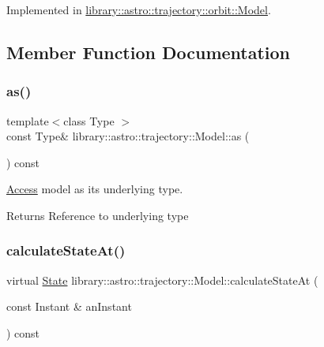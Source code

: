 Implemented in \hyperlink{classlibrary_1_1astro_1_1trajectory_1_1orbit_1_1_model_a1d580725a826a6d16d2c3d4cf2022a50}{library\+::astro\+::trajectory\+::orbit\+::\+Model}.



\subsection{Member Function Documentation}
\mbox{\label{classlibrary_1_1astro_1_1trajectory_1_1_model_a6f03598834d74ef1e03ce3469e892e6c}} 
\subsubsection{\texorpdfstring{as()}{as()}}
{\footnotesize\ttfamily template$<$class Type $>$ \\
const Type\& library\+::astro\+::trajectory\+::\+Model\+::as (\begin{DoxyParamCaption}{ }\end{DoxyParamCaption}) const\hspace{0.3cm}{\ttfamily [inline]}}



\hyperlink{classlibrary_1_1astro_1_1_access}{Access} model as its underlying type. 

\begin{DoxyReturn}{Returns}
Reference to underlying type 
\end{DoxyReturn}
\mbox{\label{classlibrary_1_1astro_1_1trajectory_1_1_model_acee9ee770c2ee1d1205b618e8f722ba4}} 
\subsubsection{\texorpdfstring{calculate\+State\+At()}{calculateStateAt()}}
{\footnotesize\ttfamily virtual \hyperlink{classlibrary_1_1astro_1_1trajectory_1_1_state}{State} library\+::astro\+::trajectory\+::\+Model\+::calculate\+State\+At (\begin{DoxyParamCaption}\item[{const Instant \&}]{an\+Instant }\end{DoxyParamCaption}) const\hspace{0.3cm}{\ttfamily [pure virtual]}}



